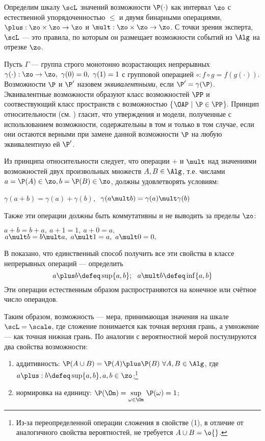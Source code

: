 Определим шкалу $\scL$ значений возможности $\P(\cdot)$ как интервал $\zo$ с естественной упорядоченностью $\leqslant$ и двумя бинарными операциями, $\plus: \zo \times \zo \rightarrow \zo$ и $\mult: \zo \times \zo \rightarrow \zo$. С точки зрения эксперта, $\scL$ --- это правила, по которым он размещает возможности событий из $\Alg$ на отрезке $\zo$. 

Пусть $\Gamma$ --- группа строго монотонно возрастающих непрерывных $\gamma(\cdot): \zo \rightarrow \zo,\ \gamma(0)=0,\ \gamma(1)=1$ с групповой операцией $\circ: f \circ g = f(g(\cdot))$. Возможности $\P$ и $\P'$ назовем {\sl эквивалентными}, если $\P' = \gamma(\P)$. Эквивалентные возможности образуют класс возможностей $\PP$ и соотвествующий класс пространств с возможностью \{$\OAP\ |\ \P \in \PP $\}. Принцип относительности (см. \cite{8}) гласит, что утверждения и модели, полученные с использованием возможности, содержательны в том и только в том случае, если они остаются верными при замене данной возможности $\P$ на любую эквивалентную ей $\P'$. 

Из принципа относительности следует, что операции $\plus$ и $\mult$ над значениями возможностей двух произвольных множеств $A, B \in \Alg$, т.е. числами $a = \P(A) \in \zo, b = \P(B) \in \zo$, должны удовлетворять условиям:
\begin{center}
  $\gamma(a \plus b) = \gamma(a) \plus \gamma(b),\ $
  $\gamma(a \mult b) = \gamma(a) \mult \gamma(b) $
\end{center}
Также эти операции должны быть коммутативны и не выводить за пределы $\zo$:
\begin{center}
  $a \plus b = b \plus a,\ a \plus 1 = 1,\ a \plus 0 = a, $\\
  $a \mult b = b \mult a,\ a \mult 1 = a,\ a \mult 0 = 0, $
\end{center}
В \cite{8} показано, что единственный способ получить все эти свойства в классе непрерывных операций --- определить
\begin{equation*}
 a \plus b \defeq \sup\{a,b\}; \ \  a \mult b \defeq \inf\{a,b\} 
\end{equation*}
Эти операции естественным образом распространяются на конечное или счётное число операндов. 

Таким образом, возможность --- мера, принимающая значения на шкале $\scL = \scale$, где сложение понимается как точная верхняя грань, а умножение --- как точная нижная грань. По аналогии с вероятностной мерой постулируются два свойства возможности:
\begin{enumerate}
 \item аддитивность: $\P(A \cup B) = \P(A) \plus \P(B)\ \forall A,B \in \Alg$, где $a \plus: b \defeq \sup\{a,b\}, a, b \in \zo$;\footnote{Из-за переопределенной операции сложения в свойстве (1), в отличие от аналогичного свойства вероятностей, не требуется $A \cup B = \o{}$.}
 \item нормировка на единицу: $\P(\Om) = \underset{\omega \in \Om}\sup\ \P({\omega}) = 1$;
\end{enumerate}

